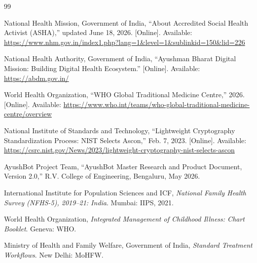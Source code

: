 \documentclass[12pt,a4paper,openany]{report}
\begin{document}
\renewcommand{\bibname}{References}
\begin{thebibliography}{99}

National Health Mission, Government of India, ``About Accredited Social Health Activist (ASHA),'' updated June 18, 2026. [Online]. Available: \url{https://www.nhm.gov.in/index1.php?lang=1&level=1&sublinkid=150&lid=226}

National Health Authority, Government of India, ``Ayushman Bharat Digital Mission: Building Digital Health Ecosystem.'' [Online]. Available: \url{https://abdm.gov.in/}

World Health Organization, ``WHO Global Traditional Medicine Centre,'' 2026. [Online]. Available: \url{https://www.who.int/teams/who-global-traditional-medicine-centre/overview}

National Institute of Standards and Technology, ``Lightweight Cryptography Standardization Process: NIST Selects Ascon,'' Feb. 7, 2023. [Online]. Available: \url{https://csrc.nist.gov/News/2023/lightweight-cryptography-nist-selects-ascon}

AyushBot Project Team, ``AyushBot Master Research and Product Document, Version 2.0,'' R.V. College of Engineering, Bengaluru, May 2026.

International Institute for Population Sciences and ICF, \textit{National Family Health Survey (NFHS-5), 2019--21: India}. Mumbai: IIPS, 2021.

World Health Organization, \textit{Integrated Management of Childhood Illness: Chart Booklet}. Geneva: WHO.

Ministry of Health and Family Welfare, Government of India, \textit{Standard Treatment Workflows}. New Delhi: MoHFW.

\end{thebibliography}
\end{document}
